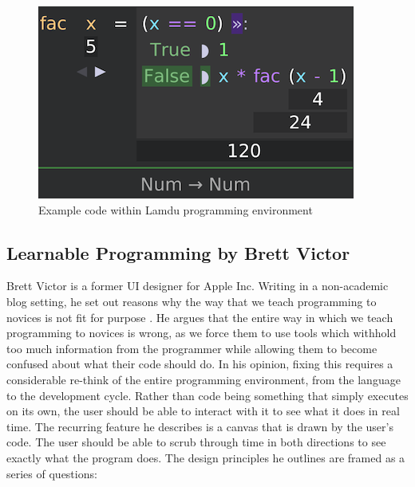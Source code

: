\begin{figure}[H]
\centering
\includegraphics[scale=0.5]{graphics/lamdu} %
\caption{Example code within Lamdu programming environment}
\label{fig:scratch} %
\end{figure}

\subsection{Learnable Programming by Brett Victor}

Brett Victor is a former UI designer for Apple Inc. Writing in a non-academic blog setting, he set out reasons why the way that we teach programming to novices is not fit for purpose \cite{BrettVictor}. He argues that the entire way in which we teach programming to novices is wrong, as we force them to use tools which withhold too much information from the programmer while allowing them to become confused about what their code should do. In his opinion, fixing this requires a considerable re-think of the entire programming environment, from the language to the development cycle. Rather than code being something that simply executes on its own, the user should be able to interact with it to see what it does in real time. The recurring feature he describes is a canvas that is drawn by the user's code. The user should be able to scrub through time in both directions to see exactly what the program does. The design principles he outlines are framed as a series of questions:

